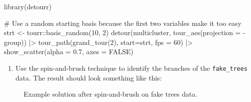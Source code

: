 \documentclass[
  letterpaper,
]{krantz}
\newenvironment{Shaded}{\begin{snugshade}}{\end{snugshade}}
\newcommand{\AttributeTok}[1]{\textcolor[rgb]{0.40,0.45,0.13}{#1}}
\newcommand{\CommentTok}[1]{\textcolor[rgb]{0.37,0.37,0.37}{#1}}
\newcommand{\ConstantTok}[1]{\textcolor[rgb]{0.56,0.35,0.01}{#1}}
\newcommand{\DecValTok}[1]{\textcolor[rgb]{0.68,0.00,0.00}{#1}}
\newcommand{\FloatTok}[1]{\textcolor[rgb]{0.68,0.00,0.00}{#1}}
\newcommand{\FunctionTok}[1]{\textcolor[rgb]{0.28,0.35,0.67}{#1}}
\newcommand{\NormalTok}[1]{\textcolor[rgb]{0.00,0.23,0.31}{#1}}
\newcommand{\OtherTok}[1]{\textcolor[rgb]{0.00,0.23,0.31}{#1}}
\newcommand{\SpecialCharTok}[1]{\textcolor[rgb]{0.37,0.37,0.37}{#1}}
\providecommand{\tightlist}{%
  \setlength{\itemsep}{0pt}\setlength{\parskip}{0pt}}\usepackage{longtable,booktabs,array}
\begin{document}
\begin{Shaded}
\begin{Highlighting}[]
\FunctionTok{library}\NormalTok{(detourr)}

\CommentTok{\# Use a random starting basis because the first two variables make it too easy}
\NormalTok{strt }\OtherTok{\textless{}{-}}\NormalTok{ tourr}\SpecialCharTok{::}\FunctionTok{basis\_random}\NormalTok{(}\DecValTok{10}\NormalTok{, }\DecValTok{2}\NormalTok{)}
\FunctionTok{detour}\NormalTok{(multicluster, }
       \FunctionTok{tour\_aes}\NormalTok{(}\AttributeTok{projection =} \SpecialCharTok{{-}}\NormalTok{group)) }\SpecialCharTok{|\textgreater{}}
       \FunctionTok{tour\_path}\NormalTok{(}\FunctionTok{grand\_tour}\NormalTok{(}\DecValTok{2}\NormalTok{), }
                 \AttributeTok{start=}\NormalTok{strt, }\AttributeTok{fps =} \DecValTok{60}\NormalTok{) }\SpecialCharTok{|\textgreater{}}
       \FunctionTok{show\_scatter}\NormalTok{(}\AttributeTok{alpha =} \FloatTok{0.7}\NormalTok{, }
                    \AttributeTok{axes =} \ConstantTok{FALSE}\NormalTok{)}
\end{Highlighting}
\end{Shaded}

\begin{enumerate}
\def\labelenumi{\arabic{enumi}.}
\setcounter{enumi}{3}
\tightlist
\item
  Use the spin-and-brush technique to identify the branches of the
  \texttt{fake\_trees} data. The result should look something like this:
\end{enumerate}

\begin{figure}


\caption{\label{fig-fake-trees-sb}Example solution after spin-and-brush
on fake trees data.}

\end{figure}%
\end{document}
